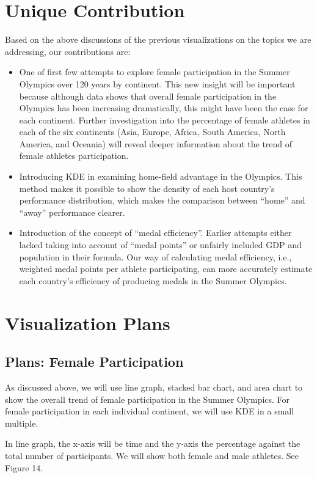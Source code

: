 \documentclass[12pt]{article}
\begin{document}
\section{Unique Contribution}
Based on the above discussions of the previous visualizations on the topics we are addressing, our contributions are:
\begin{itemize}
    \item One of first few attempts to explore female participation in the Summer Olympics over 120 years by continent. This new insight will be important because although data shows that overall female participation in the Olympics has been increasing dramatically, this might have been the case for each continent. Further investigation into the percentage of female athletes in each of the six continents (Asia, Europe, Africa, South America, North America, and Oceania) will reveal deeper information about the trend of female athletes participation. 
    
    \item Introducing KDE in examining home-field advantage in the Olympics. This method makes it possible to show the density of each host country’s performance distribution, which makes the comparison between “home” and “away” performance clearer. 
    
    \item Introduction of the concept of “medal efficiency”. Earlier attempts either lacked taking into account of “medal points” or unfairly included GDP and population in their formula. Our way of calculating medal efficiency, i.e., weighted medal points per athlete participating, can more accurately estimate each country’s efficiency of producing medals in the Summer Olympics. 
\end{itemize}

\section{Visualization Plans}
\subsection{Plans: Female Participation}
As discussed above, we will use line graph, stacked bar chart, and area chart to show the overall trend of female participation in the Summer Olympics. For female participation in each individual continent, we will use KDE in a small multiple. 

In line graph, the x-axis will be time and the y-axis the percentage against the total number of participants. We will show both female and male athletes. See Figure 14.
\end{document}
